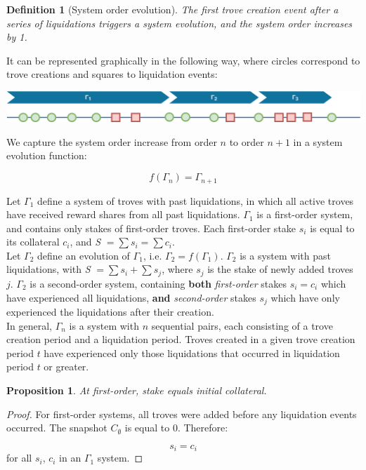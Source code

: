\documentclass[reqno]{article}
\newtheorem{definition}{Definition}[section]
\newtheorem{proposition}[theorem]{Proposition}
\begin{document}
\begin{definition}[System order evolution]
  The first trove creation event after a series of liquidations triggers a system evolution, and the system order increases by 1.
\end{definition}

It can be represented graphically in the following way, where circles correspond to trove creations and squares to liquidation events:

\includegraphics[width=\linewidth]{System_order_evolution_generic.png}

We capture the system order increase from order $n$ to order $n+1$  in a system evolution function:

\begin{equation} 
    f(\Gamma_n)=\Gamma_{n+1}
\end{equation}

\bigskip
Let $\Gamma_1$ define a system of troves with past liquidations, in which all active troves have received reward shares from all past liquidations. $\Gamma_1$ is a first-order system, and contains only stakes of first-order troves. Each first-order stake $s_i$ is equal to its collateral $c_i$, and \textit{S} $= \sum s_i = \sum c_i$.\\

Let $\Gamma_2$ define an evolution of $\Gamma_1$, i.e. $\Gamma_2 = f(\Gamma_1)$. $\Gamma_2$ is a system with past liquidations, with \textit{S} $= \sum s_i + \sum s_j$, where $s_j$ is the stake of newly added troves $j$. $\Gamma_2$ is a second-order system, containing \textbf{both} \textit{first-order} stakes $s_i = c_i$ which have experienced all liquidations, \textbf{and} \textit{second-order} stakes $s_j$ which have only experienced the liquidations after their creation.\\

In general, $\Gamma_n$ is a system with $n$ sequential pairs, each consisting of a trove creation period and a liquidation period. Troves created in a given trove creation period $t$ have experienced only those liquidations that occurred in liquidation period $t$ or greater.

\begin{proposition}
  At first-order, stake equals initial collateral.
\end{proposition}
\begin{proof}
For first-order systems, all troves were added before any liquidation events occurred. The snapshot $C_\emptyset$ is equal to 0. Therefore:

\begin{equation}
    s_i=c_i
\end{equation}
for all $s_i$, $c_i$ in an $\Gamma_1$ system.
\end{proof}
\end{document}
